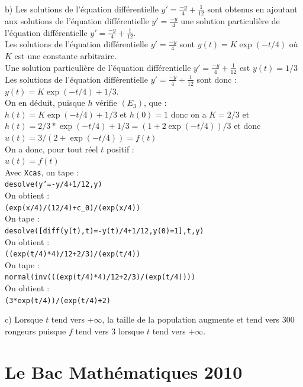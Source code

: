 \documentclass[a4paper,11pt]{book}
\begin{document}
b) Les solutions  de l'\'equation diff\'erentielle 
$\displaystyle y'=\frac{-y}{4}+\frac{1}{12}$ sont obtenus en ajoutant aux 
solutions  de l'\'equation diff\'erentielle 
$\displaystyle y'=\frac{-y}{4}$ une solution particuli\`ere de l'\'equation 
diff\'erentielle $\displaystyle y'=\frac{-y}{4}+\frac{1}{12}$.\\
 Les solutions  de l'\'equation diff\'erentielle 
$\displaystyle y'=\frac{-y}{4}$ sont $y(t)=K\exp(-t/4)$ o\`u $K$ est une 
constante arbitraire.\\
Une solution particuli\`ere de l'\'equation 
diff\'erentielle $\displaystyle y'=\frac{-y}{4}+\frac{1}{12}$ est $y(t)=1/3$
Les solutions  de l'\'equation diff\'erentielle 
$\displaystyle y'=\frac{-y}{4}+\frac{1}{12}$ sont donc :\\
$y(t)=K\exp(-t/4)+1/3$.\\
On en d\'eduit, puisque $h$ v\'erifie $(E_3)$, que :\\
$h(t)= K\exp(-t/4)+1/3$ et $h(0)=1$ donc on a $K=2/3$ et \\
$h(t)= 2/3*\exp(-t/4)+1/3=(1+2\exp(-t/4))/3$ et donc\\
$u(t)=3/(2+\exp(-t/4))=f(t)$\\
On a donc, pour tout r\'eel $t$ positif :\\
$u(t)=f(t)$\\
Avec {\tt Xcas}, on tape :\\
{\tt desolve(y'=-y/4+1/12,y)}\\
On obtient :\\
{\tt (exp(x/4)/(12/4)+c\_0)/(exp(x/4))}\\
On tape :\\
{\tt desolve([diff(y(t),t)=-y(t)/4+1/12,y(0)=1],t,y)}\\
On obtient :\\
{\tt ((exp(t/4)*4)/12+2/3)/(exp(t/4))}\\
On tape :\\
{\tt normal(inv(((exp(t/4)*4)/12+2/3)/(exp(t/4))))}\\
On obtient :\\
{\tt (3*exp(t/4))/(exp(t/4)+2)}

c) Lorsque $t$ tend vers $+\infty$, la taille de la population augmente et 
tend vers 300 rongeurs puisque $f$ tend vers 3 lorsque $t$ tend vers $+\infty$.


\chapter{Le Bac  Math\'ematiques 2010}
\end{document}
